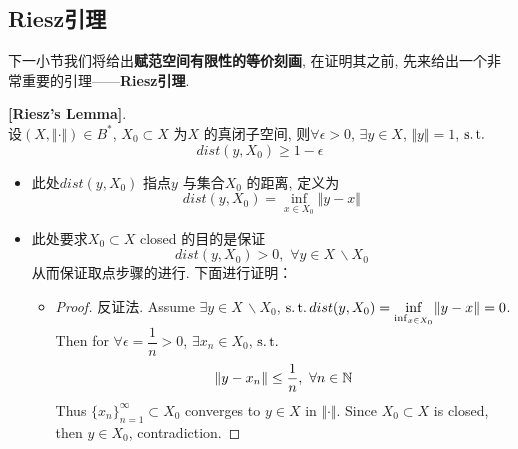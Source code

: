 \newpage

\subsection{Riesz引理}
	下一小节我们将给出\textbf{赋范空间有限性的等价刻画}, 在证明其之前, 先来给出一个非常重要的引理——\textbf{Riesz引理}. 
	
	\vspace{2em}
	
	\begin{lemma}\label{lemma 2.2.5}
		\textbf{[Riesz's Lemma]}. \\
		设$(X , \Vert \cdot \Vert) \in B^*$, $X_0 \subset X$ 为$X$ 的真闭子空间, 则$\forall \epsilon > 0$, $\exists y \in X$, $\Vert y \Vert = 1$, $\operatorname{s.t.}$
		\[ dist(y , X_0) \geq 1 - \epsilon \]
		
		\vspace{4em}
		
		\begin{rmk}
			\begin{itemize}
				\item 此处$dist(y , X_0)$ 指点$y$ 与集合$X_0$ 的距离, 定义为
				\[ dist(y  ,X_0) = \inf_{x \in X_0} \Vert y - x \Vert \]
				
				
				\item 此处要求$X_0 \subset X$ closed 的目的是保证
				\[ dist(y , X_0) > 0 , \,\, \forall y \in X \, \backslash X_0 \]
				从而保证取点步骤的进行. 下面进行证明：
				
				
				\begin{itemize}
					\item 
					\begin{proof}
						反证法. Assume $\exists y \in X \, \backslash X_0$, $\operatorname{s.t.} dist(y , X_0) = \underset{\inf_{x \in X_0}}{\inf} \Vert y - x \Vert = 0$. \\
						Then for $\forall \epsilon = \dfrac{1}{n} > 0$, $\exists x_n \in X_0$, $\operatorname{s.t.}$
						\[ \Vert y - x_n \Vert \leq \frac{1}{n} , \,\, \forall n \in \mathbb{N} \]
						Thus $\{ x_n \}_{n = 1}^{\infty} \subset X_0$ converges to $y \in X$ in $\Vert \cdot \Vert$. Since $X_0 \subset X$ is closed, then $y \in X_0$, contradiction.
					\end{proof}
				\end{itemize}
			\end{itemize}
		\end{rmk}
		

\end{lemma}
